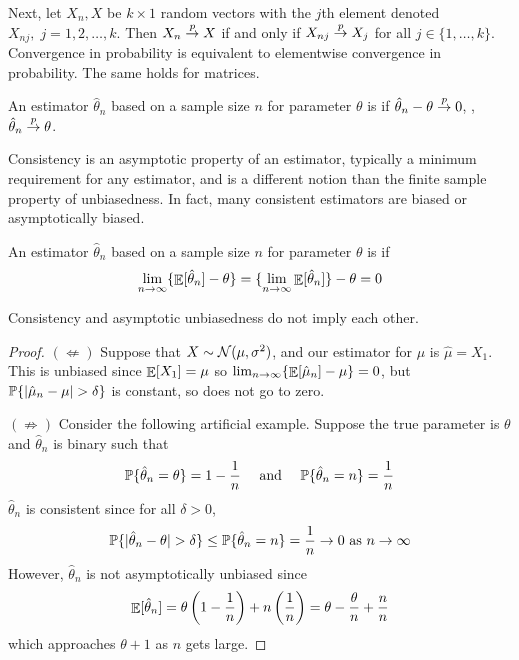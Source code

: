 \documentclass[10pt]{article}
\begin{document}
Next, let $X_n,X$ be $k \times 1$ random vectors with the $j$th element denoted $X_{nj},\; j = 1,2,\dots,k$. Then $X_n \overset{p}{\to} X$ if and only if $X_{nj} \overset{p}{\to} X_j$ for all $j \in \{1,\dots,k\}$. Convergence in probability is equivalent to elementwise convergence in probability. The same holds for matrices.


\begin{definition}
	An estimator $\hat{\theta}_n$ based on a sample size $n$ for parameter $\theta$ is  if $\hat{\theta}_n - \theta \overset{p}{\to} 0$, \ie, $\hat{\theta}_n \overset{p}{\to} \theta$. 
\end{definition}

\begin{remark}
	Consistency is an asymptotic property of an estimator, typically a minimum requirement for any estimator, and is a different notion than the finite sample property of unbiasedness. In fact, many consistent estimators are biased or asymptotically biased.
\end{remark}

\begin{definition}
	An estimator $\hat{\theta}_n$ based on a sample size $n$ for parameter $\theta$ is   if 
	\[
	\lim_{n\to\infty}\{\mathop{\mathbb{E}}[\hat{\theta}_n] - \theta\} = \{\lim_{n\to\infty}\mathop{\mathbb{E}}[\hat{\theta}_n]\} - \theta = 0
	\]
\end{definition}

\begin{theorem}
	Consistency and asymptotic unbiasedness do not imply each other.
\end{theorem}
\begin{proof}
	$(\not\Leftarrow)$ Suppose that $X \sim \mathcal{N}(\mu,\sigma^2)$, and our estimator for $\mu$ is $\hat{\mu} = X_1$. This is unbiased since $\mathop{\mathbb{E}}[X_1] = \mu$ so $\lim_{n\to\infty}\{\mathop{\mathbb{E}}[\hat{\mu}_n] - \mu\} = 0$, but $\mathbb{P}\{|\hat{\mu}_n - \mu| > \delta\}$ is constant, so does not go to zero.
	
	$(\not\Rightarrow)$ Consider the following artificial example. Suppose the true parameter is $\theta$ and $\hat{\theta}_n$ is binary such that
	\[
	\mathbb{P}\{\hat{\theta}_n = \theta\} = 1 - \frac{1}{n} \quad \text{ and } \quad \mathbb{P}\{\hat{\theta}_n = n \} = \frac{1}{n}
	\]
	$\hat{\theta}_n$ is consistent since for all $\delta > 0$,
	\[
	\mathbb{P}\{| \hat{\theta}_n - \theta| > \delta\} \le \mathbb{P}\{\hat{\theta}_n = n\} = \frac{1}{n} \to 0 \text{ as } n \to \infty
	\]
	However, $\hat{\theta}_n$ is not asymptotically unbiased since
	\[
	\mathop{\mathbb{E}}[\hat{\theta}_n] = \theta \left( 1 - \frac{1}{n}\right) + n\left( \frac{1}{n}\right) = \theta - \frac{\theta}{n} + \frac{n}{n}
	\]
	which approaches $\theta + 1$ as $n$ gets large.
\end{proof}
\end{document}

